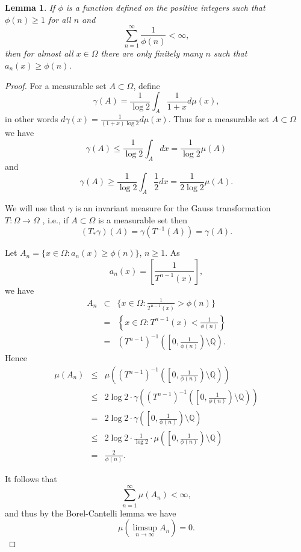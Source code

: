 \documentclass{article}
\newtheorem{lemma}[theorem]{Lemma}
\begin{document}
\begin{lemma}
If $\phi$ is a function defined on the positive integers such that $\phi(n) \geq 1$ for all $n$ and 
\[
\sum_{n=1}^\infty \frac{1}{\phi(n)}<\infty,
\]
then for almost all $x \in \Omega$ there are only finitely many $n$ such that $a_n(x) \geq \phi(n)$.
\label{partialquotients}
\end{lemma}
\begin{proof}
For a measurable set $A \subset \Omega$, define
\[
\gamma(A)=\frac{1}{\log 2}\int_A \frac{1}{1+x} d\mu(x),
\]
in other words $d\gamma(x) = \frac{1}{(1+x)\log 2} d\mu(x)$.
Thus for a measurable set $A \subset \Omega$ we have
\[
\gamma(A) \leq \frac{1}{\log 2}\int_A dx = \frac{1}{\log 2}\mu(A)
\]
and
\[
\gamma(A) \geq \frac{1}{\log 2}\int_A \frac{1}{2}dx=\frac{1}{2\log 2}\mu(A).
\]

We will use that $\gamma$ is an invariant measure for the Gauss transformation $T:\Omega \to \Omega$  \cite[p.~77, Lemma 3.5]{einsiedler}, i.e., if $A \subset \Omega$ is a measurable set
then
\[
(T_*\gamma)(A) = \gamma(T^{-1}(A))=\gamma(A).
\]

Let $A_n=\{x \in \Omega: a_n(x) \geq \phi(n)\}$, $n \geq 1$. 
As 
\[
a_n(x)=\left[ \frac{1}{T^{n-1}(x)} \right],
\]
we have
\begin{eqnarray*}
A_n&\subset&\{x \in \Omega: \frac{1}{T^{n-1}(x)} > \phi(n) \}\\
&=&\left\{x \in \Omega: T^{n-1}(x) < \frac{1}{\phi(n)} \right\}\\
&=&(T^{n-1})^{-1}\left( \left[0,\frac{1}{\phi(n)}\right) \setminus \mathbb{Q} \right).
\end{eqnarray*}
Hence
\begin{eqnarray*}
\mu(A_n)&\leq&\mu\left((T^{n-1})^{-1}\left( \left[0,\frac{1}{\phi(n)}\right) \setminus \mathbb{Q} \right)\right)\\
&\leq& 2\log 2 \cdot \gamma\left((T^{n-1})^{-1}\left( \left[0,\frac{1}{\phi(n)}\right) \setminus \mathbb{Q} \right)\right)\\
&=&2\log 2 \cdot \gamma \left( \left[0,\frac{1}{\phi(n)}\right) \setminus \mathbb{Q} \right)\\
&\leq&2 \log 2 \cdot \frac{1}{\log 2} \cdot \mu \left( \left[0,\frac{1}{\phi(n)}\right) \setminus \mathbb{Q} \right)\\
&=&\frac{2}{\phi(n)}.
\end{eqnarray*}

It follows that 
\[
\sum_{n=1}^\infty \mu(A_n)<\infty,
\]
and thus by the Borel-Cantelli lemma \cite[p.~59, Theorem 4.3]{billingsley} we have
\[
\mu(\limsup_{n \to \infty} A_n)=0.
\]
\end{proof}
\end{document}
